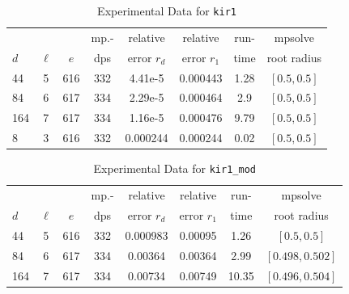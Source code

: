 \documentclass[runningheads]{llncs}
\begin{document}
\begin{table}
\caption{Experimental Data for \texttt{kir1}} %
\label{tab:kir1}
\vskip -0.15in
\begin{center}
\begin{small}
\begin{sc}
\begin{tabular}{lccccccc}
\toprule
&  &  & mp.-& relative  & relative & run- & mpsolve \\
$d$& $\ell$& $e$ & dps&error $r_d$       & error $r_1$ &time& root radius\\
\midrule
 44 & 5 & 616 & 332 & 4.41e-5 & 0.000443 & 1.28 & $[0.5, 0.5]$\\
  84 & 6 & 617 & 334 & 2.29e-5 & 0.000464 & 2.9 & $[0.5, 0.5]$\\
 164 & 7 & 617 & 334 & 1.16e-5 & 0.000476 & 9.79 & $[0.5, 0.5]$\\
 8 & 3 & 616 & 332 & 0.000244 & 0.000244 & 0.02 & $[0.5, 0.5]$\\ %
\bottomrule
\end{tabular}
\end{sc}
\end{small}
\end{center}
\vskip 0.05in
\end{table}

\begin{table}
\caption{Experimental Data for \texttt{kir1\_mod}} %
\label{tab:kir1_mod}
\vskip -0.15in
\begin{center}
\begin{small}
\begin{sc}
\begin{tabular}{lccccccc}
\toprule
&  &  & mp.-& relative  & relative & run- & mpsolve \\
$d$& $\ell$& $e$ & dps&error $r_d$       & error $r_1$ &time& root radius\\
\midrule
 44 & 5 & 616 & 332 & 0.000983 & 0.00095 & 1.26 & $[0.5, 0.5]$\\
 84 & 6 & 617 & 334 & 0.00364 & 0.00364 & 2.99 & $[0.498, 0.502]$\\
 164 & 7 & 617 & 334 & 0.00734 & 0.00749 & 10.35 & $[0.496, 0.504]$\\ %
\bottomrule
\end{tabular}
\end{sc}
\end{small}
\end{center}
\vskip 0.05in
\end{table}
\end{document}
